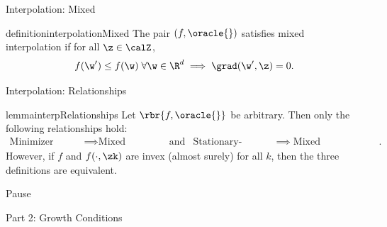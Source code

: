 \documentclass[mathserif,notheorems, hyperref={colorlinks, citecolor=blue, urlcolor=blue, linkcolor=blue}]{beamer}
\def\\{}%
\begin{document}
    \begin{frame}{Interpolation: Mixed}
        \begin{figure}
           \centering 
             
        \end{figure}

        \begin{restatable}{definition}{interpolationMixed}\label{def:interpolation-mixed}
            The pair \( (f, \oracle{}) \) satisfies mixed interpolation if for all \( \z \in \calZ \),
            \[ f(\w') \leq f(\w) \; \forall \w \in \R^d \implies \grad(\w', \z) = 0. \]
        \end{restatable}

    \end{frame}

    \begin{frame}{Interpolation: Relationships}

        \begin{restatable}{lemma}{interpRelationships}
            Let \( \rbr{f, \oracle{}} \) be arbitrary. 
            Then only the following relationships hold: 
            \begin{align*}
                \text{Minimizer Interpolation} &\implies \text{Mixed Interpolation} \\
                                                                                       & \text{and} &\\
                \text{Stationary-Point Interpolation} &\implies \text{Mixed Interpolation}.
            \end{align*}
            However, if \( f \) and \( f(\cdot, \zk) \) are invex (almost surely) for all \( k \), then the three definitions are equivalent. 
        \end{restatable}
        
    \end{frame}
  


    \begin{frame}
       \begin{center}
          \huge Pause 
       \end{center} 
    \end{frame}


    \begin{frame}
       \begin{center}
          \huge Part 2: Growth Conditions 
       \end{center} 
    \end{frame}
\end{document}

